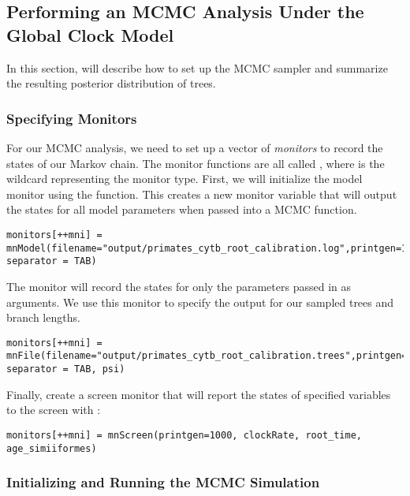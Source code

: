 \bigskip
\subsection{Performing an MCMC Analysis Under the Global Clock Model}

In this section, will describe how to set up the MCMC sampler and summarize the resulting posterior distribution of trees. 

\subsubsection{Specifying Monitors}

For our MCMC analysis, we need to set up a vector of \textit{monitors} to record the states of our Markov chain. 
The monitor functions are all called , where \cl{*} is the wildcard representing the monitor type.
First, we will initialize the model monitor using the  function. This creates a new monitor variable that will output the states for all model parameters when passed into a MCMC function. 
{\tt \begin{snugshade*}
\begin{lstlisting}
monitors[++mni] = mnModel(filename="output/primates_cytb_root_calibration.log",printgen=10, separator = TAB)
\end{lstlisting}
\end{snugshade*}}

The  monitor will record the states for only the parameters passed in as arguments. We use this monitor to specify the output for our sampled trees and branch lengths.

{\tt \begin{snugshade*}
\begin{lstlisting}
monitors[++mni] = mnFile(filename="output/primates_cytb_root_calibration.trees",printgen=10, separator = TAB, psi)
\end{lstlisting}
\end{snugshade*}}


Finally, create a screen monitor that will report the states of specified variables to the screen with :
{\tt \begin{snugshade*}
\begin{lstlisting}
monitors[++mni] = mnScreen(printgen=1000, clockRate, root_time, age_simiiformes)
\end{lstlisting}
\end{snugshade*}}

\subsubsection{Initializing and Running the MCMC Simulation}

